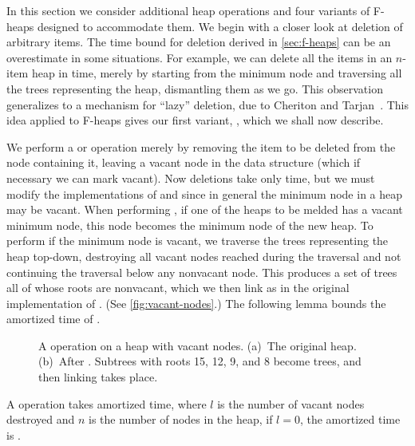 In this section we consider additional heap operations and four variants of F-heaps
designed to accommodate them. We begin with a closer look at deletion of arbitrary
items. The  time bound for deletion derived in \autoref{sec:f-heaps} can
be an overestimate in some situations. For example, we can delete all the items in an
\(n\)-item heap in  time, merely by starting from the minimum node and
traversing all the trees representing the heap, dismantling them as we go. This
observation generalizes to a mechanism for ``lazy'' deletion, due to Cheriton and
Tarjan~\cite{CheritonTarjan1976}. This idea applied to F-heaps gives our first
variant, , which we shall now describe.

We perform a  or  operation merely by removing the item
to be deleted from the node containing it, leaving a vacant node in the data
structure (which if necessary we can mark vacant). Now deletions take only 
time, but we must modify the implementations of  and  since
in general the minimum node in a heap may be vacant. When performing , if
one of the heaps to be melded has a vacant minimum node, this node becomes the
minimum node of the new heap. To perform  if the minimum node is
vacant, we traverse the trees representing the heap top-down, destroying all vacant
nodes reached during the traversal and not continuing the traversal below any
nonvacant node. This produces a set of trees all of whose roots are nonvacant, which
we then link as in the original implementation of . (See
\autoref{fig:vacant-nodes}.) The following lemma bounds the amortized time of
.

\begin{figure}
    \caption{A  operation on a heap with vacant nodes. (a)~The original
    heap. (b)~After . Subtrees with roots 15, 12, 9, and 8 become
    trees, and then linking takes place.}
    \label{fig:vacant-nodes}
\end{figure}

\begin{lemma}
    A  operation takes  amortized time, where
    \(l\) is the number of vacant nodes destroyed and \(n\) is the number of nodes in
    the heap, if \(l = 0\), the amortized time is .
\end{lemma}

